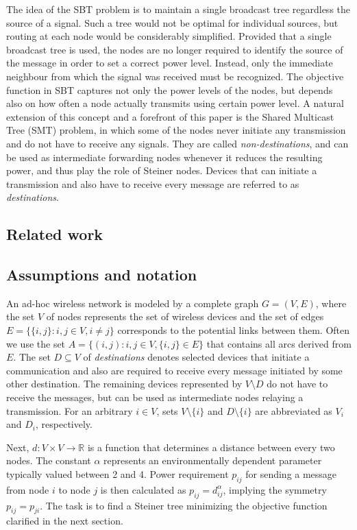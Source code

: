 The idea of the SBT problem is to maintain a single broadcast tree regardless the source of a signal. Such a tree would not be optimal for individual sources, but routing at each node would be considerably simplified. Provided that a single broadcast tree is used, the nodes are no longer required to identify the source of the message in order to set a correct power level. Instead, only the immediate neighbour from which the signal was received must be recognized. The objective function in SBT captures not only the power levels of the nodes, but depends also on how often a node actually transmits using certain power level. A natural extension of this concept and a forefront of this paper is the Shared Multicast Tree (SMT) problem, in which some of the nodes never initiate any transmission and do not have to receive any signals. They are called \emph{non-destinations}, and can be used as intermediate forwarding nodes whenever it reduces the resulting power, and thus play the role of Steiner nodes. Devices that can initiate a transmission and also have to receive every message are referred to as \emph{destinations}.

\subsection{Related work}
\subsection{Assumptions and notation}
An ad-hoc wireless network is modeled by a complete graph $G=(V,E)$, where the set $V$ of nodes represents the set of wireless devices and the set of edges $E=\{\{i,j\}:i,j\in V, i\neq j\}$ corresponds to the potential links between them. Often we use the set $A=\{(i,j):i,j\in V,\{i,j\}\in E\}$ that contains all arcs derived from $E$. The set $D\subseteq V$ of \emph{destinations} denotes selected devices that initiate a communication and also are required to receive every message initiated by some other destination. The remaining devices represented by $V\setminus D$ do not have to receive the messages, but can be used as intermediate nodes relaying a transmission. For an arbitrary $i\in V$, sets $V\setminus \{i\}$ and $D\setminus\{i\}$ are abbreviated as $V_i$ and $D_i$, respectively. 

Next, $d: V\times V\rightarrow \mathbb{R}$ is a function that determines a distance between every two nodes. The constant $\alpha$ represents an environmentally dependent parameter typically valued between 2 and 4. Power requirement $p_{ij}$ for sending a message from node $i$ to node $j$ is then calculated as $p_{ij}=d^{\alpha}_{ij}$, implying the symmetry $p_{ij}=p_{ji}$. The task is to find a Steiner tree minimizing the objective function clarified in the next section.

